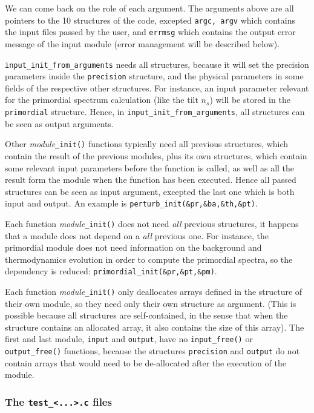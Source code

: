 \documentclass{article}
\begin{document}
\vspace{0.5cm}

We can come back on the role of each argument. The arguments above are all pointers to the 10 structures of the code, excepted {\tt argc, argv} which contains the input files passed by the user, and {\tt errmsg} which contains the output error message of the input module (error management will be described below).

{\tt  input\_init\_from\_arguments} needs all structures, because it will set the precision parameters inside the {\tt precision} structure, and the physical parameters in some fields of the respective other structures. For instance, an input parameter relevant for the primordial spectrum calculation (like the tilt $n_s$) will be stored in the {\tt primordial} structure. Hence, in {\tt  input\_init\_from\_arguments}, all structures can be seen as output arguments.

Other {\it module}{\tt \_init()} functions typically need all previous structures, which contain the result of the previous modules, plus its own structures, which contain some relevant input parameters before the function is called, as well as all the result form the module when the function has been executed. Hence all passed structures can be seen as input argument, excepted the last one which is both input and output. An example is {\tt perturb\_init(\&pr,\&ba,\&th,\&pt)}.

Each function {\it module}{\tt \_init()}  does not need {\it all} previous structures, it happens that a module does not depend on a {\it all} previous one. For instance, the primordial module does not need information on the background and thermodynamics evolution in order to compute the primordial spectra, so the dependency is reduced: {\tt primordial\_init(\&pr,\&pt,\&pm)}.

Each function {\it module}{\tt \_init()} only deallocates arrays defined in the structure of their own module, so they need only their own structure as argument. (This is possible because all structures are self-contained, in the sense that when the structure contains an allocated array, it also contains the size of this array). The first and last module, {\tt input} and {\tt output}, have no {\tt input\_free()} or {\tt output\_free()} functions, because the structures {\tt precision} and {\tt output} do not contain arrays that would need to be de-allocated after the execution of the module.

\subsubsection{The {\tt test\_<...>.c} files}
\end{document}
